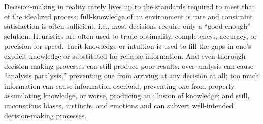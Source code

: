 

Decision-making in reality rarely lives up to the standards required to meet
that of the idealized process; full-knowledge of an environment is rare and
constraint satisfaction is often sufficient, i.e., most decisions require only a
``good enough'' solution. Heuristics are often used to trade optimality,
completeness, accuracy, or precision for speed. Tacit knowledge or intuition is
used to fill the gaps in one's explicit knowledge or substituted for reliable
information. And even thorough decision-making processes can still produce
poor results: over-analysis can cause ``analysis paralysis,'' preventing one
from arriving at any decision at all; too much information can cause information
overload, preventing one from properly assimilating knowledge, or worse,
producing an illusion of knowledge; and still, unconscious biases, instincts, and
emotions and can subvert well-intended decision-making processes.


